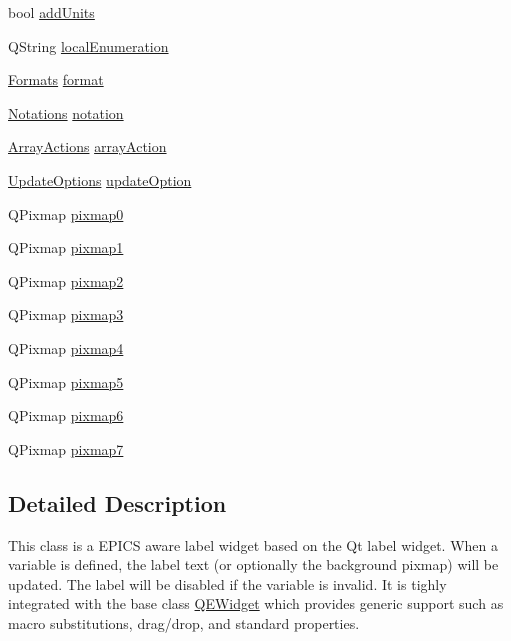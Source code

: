 \begin{DoxyCompactItemize}
bool \hyperlink{classQELabel_a5f23f1e7bf3363bb5227b0ee77815165}{addUnits}
\item 
QString \hyperlink{classQELabel_aae33395c63123b2e78a15d054b619d18}{localEnumeration}
\item 
\hyperlink{classQELabel_aabe3af69c52e02d9b1341f894644dc6b}{Formats} \hyperlink{classQELabel_a7ffba4d987689b6b3bf9d3d4a5bed749}{format}
\item 
\hyperlink{classQELabel_ab0a211fb5b8bd3f95b8c40b4aaaf839c}{Notations} \hyperlink{classQELabel_a82cd9d9a32b2a4b39b3f0ee0c103c2be}{notation}
\item 
\hyperlink{classQELabel_a276168b3a99f546208827eda615caa7b}{ArrayActions} \hyperlink{classQELabel_a977fd9a4156e6fa13213a03bc9168be2}{arrayAction}
\item 
\hyperlink{classQELabel_aae708a1c23d06d625b4f2f87bdc3fbe4}{UpdateOptions} \hyperlink{classQELabel_a04d0f5e68531f66b82661f928b2e6dc9}{updateOption}
\item 
QPixmap \hyperlink{classQELabel_ad99c4d55198c39bea42eb391c71e29aa}{pixmap0}
\item 
QPixmap \hyperlink{classQELabel_a825fa1c02e643af57502d686354712cc}{pixmap1}
\item 
QPixmap \hyperlink{classQELabel_ac325b3d9005dd3e7747d9124a8b7618c}{pixmap2}
\item 
QPixmap \hyperlink{classQELabel_a57180f761e931d984882e18a696feda7}{pixmap3}
\item 
QPixmap \hyperlink{classQELabel_ad7454834a438e24744fbaca27cf75f80}{pixmap4}
\item 
QPixmap \hyperlink{classQELabel_a059f6c9e30a31cb7783223bfb5961ed7}{pixmap5}
\item 
QPixmap \hyperlink{classQELabel_aef12b4be5226b9e2660b69873f029122}{pixmap6}
\item 
QPixmap \hyperlink{classQELabel_a65da0ef3bc0c5f289070763c7c794e77}{pixmap7}
\end{DoxyCompactItemize}


\subsection{Detailed Description}
This class is a EPICS aware label widget based on the Qt label widget. When a variable is defined, the label text (or optionally the background pixmap) will be updated. The label will be disabled if the variable is invalid. It is tighly integrated with the base class \hyperlink{classQEWidget}{QEWidget} which provides generic support such as macro substitutions, drag/drop, and standard properties. 

